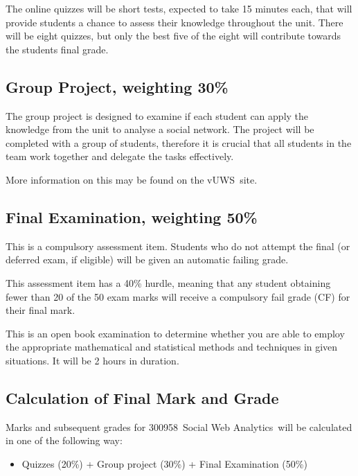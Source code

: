 \documentclass[a4paper,oneside]{book}
\newcommand{\vuws}{vUWS}
\newcommand{\unitcode}{300958}
\newcommand{\unitname}{Social Web Analytics}
\begin{document}
The online quizzes will be short tests, expected to take 15 minutes
each, that will provide students a chance to assess their knowledge
throughout the unit.  There will be eight quizzes, but only the best
five of the eight will contribute towards the students final grade.

\subsection*{Group Project, weighting 30\%}

The group project is designed to examine if each student can apply the
knowledge from the unit to analyse a social network.  The project
will be completed with a group of students, therefore it is crucial
that all students in the team work together and delegate the tasks
effectively.

More information on this may be found on the \vuws~site.


\subsection*{Final Examination, weighting 50\%}

This is a compulsory assessment item. Students who do not attempt the
final (or deferred exam, if eligible) will be given an automatic
failing grade.

This assessment item has a 40\% hurdle, meaning that any student
obtaining fewer than 20 of the 50 exam marks will receive a compulsory
fail grade (CF) for their final mark.

This is an open book examination to determine whether you are able to
employ the appropriate mathematical and statistical methods and
techniques in given situations. It will be 2 hours in duration.




\subsection*{Calculation of Final Mark and Grade}




Marks and subsequent grades for \unitcode~\unitname~will be
calculated in one of the following way:
\begin{itemize}
\item
  Quizzes (20\%) + Group project (30\%) + Final Examination (50\%)
\end{itemize}
\end{document}
